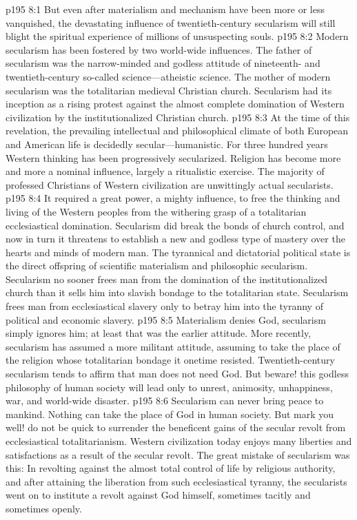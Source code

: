 \vs p195 8:1 But even after materialism and mechanism have been more or less vanquished, the devastating influence of twentieth\hyp{}century secularism will still blight the spiritual experience of millions of unsuspecting souls.
\vs p195 8:2 Modern secularism has been fostered by two world\hyp{}wide influences. The father of secularism was the narrow\hyp{}minded and godless attitude of nineteenth\hyp{} and twentieth\hyp{}century so\hyp{}called science---atheistic science. The mother of modern secularism was the totalitarian medieval Christian church. Secularism had its inception as a rising protest against the almost complete domination of Western civilization by the institutionalized Christian church.
\vs p195 8:3 At the time of this revelation, the prevailing intellectual and philosophical climate of both European and American life is decidedly secular---humanistic. For three hundred years Western thinking has been progressively secularized. Religion has become more and more a nominal influence, largely a ritualistic exercise. The majority of professed Christians of Western civilization are unwittingly actual secularists.
\vs p195 8:4 It required a great power, a mighty influence, to free the thinking and living of the Western peoples from the withering grasp of a totalitarian ecclesiastical domination. Secularism did break the bonds of church control, and now in turn it threatens to establish a new and godless type of mastery over the hearts and minds of modern man. The tyrannical and dictatorial political state is the direct offspring of scientific materialism and philosophic secularism. Secularism no sooner frees man from the domination of the institutionalized church than it sells him into slavish bondage to the totalitarian state. Secularism frees man from ecclesiastical slavery only to betray him into the tyranny of political and economic slavery.\plusone
\pc \vs p195 8:5 Materialism denies God, secularism simply ignores him; at least that was the earlier attitude. More recently, secularism has assumed a more militant attitude, assuming to take the place of the religion whose totalitarian bondage it onetime resisted. Twentieth\hyp{}century secularism tends to affirm that man does not need God. But beware! this godless philosophy of human society will lead only to unrest, animosity, unhappiness, war, and world\hyp{}wide disaster.
\pc \vs p195 8:6 Secularism can never bring peace to mankind. Nothing can take the place of God in human society. But mark you well! do not be quick to surrender the beneficent gains of the secular revolt from ecclesiastical totalitarianism. Western civilization today enjoys many liberties and satisfactions as a result of the secular revolt. The great mistake of secularism was this: In revolting against the almost total control of life by religious authority, and after attaining the liberation from such ecclesiastical tyranny, the secularists went on to institute a revolt against God himself, sometimes tacitly and sometimes openly.
